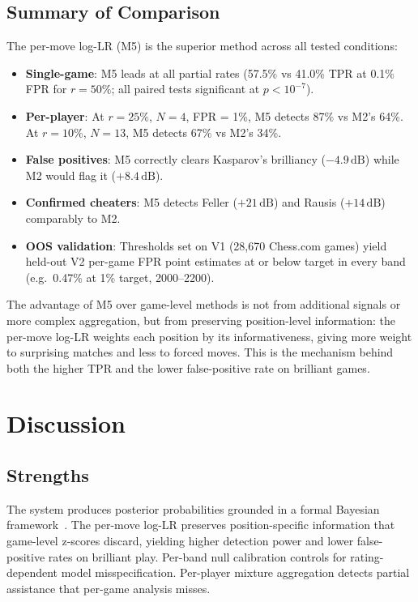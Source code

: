 \documentclass[11pt,a4paper]{article}
\newcommand{\dB}{\,\mathrm{dB}}
\theoremstyle{definition}
\begin{document}
\subsection{Summary of Comparison}
\label{sec:synth-summary}

The per-move log-LR (M5) is the superior method across all tested
conditions:

\begin{itemize}[nosep]
  \item \textbf{Single-game}: M5 leads at all partial rates
    (57.5\% vs 41.0\% TPR at 0.1\% FPR for $r = 50\%$; all paired
    tests significant at $p < 10^{-7}$).
  \item \textbf{Per-player}: At $r = 25\%$, $N = 4$, FPR = 1\%,
    M5 detects 87\% vs M2's 64\%.  At $r = 10\%$, $N = 13$, M5
    detects 67\% vs M2's 34\%.
  \item \textbf{False positives}: M5 correctly clears Kasparov's
    brilliancy ($-4.9\dB$) while M2 would flag it ($+8.4\dB$).
  \item \textbf{Confirmed cheaters}: M5 detects Feller ($+21\dB$)
    and Rausis ($+14\dB$) comparably to M2.
  \item \textbf{OOS validation}: Thresholds set on V1 (28{,}670
    Chess.com games) yield held-out V2 per-game FPR point estimates
    at or below target in every band (e.g.\ 0.47\% at 1\% target,
    2000--2200).
\end{itemize}

\noindent
The advantage of M5 over game-level methods is not from additional
signals or more complex aggregation, but from preserving
position-level information: the per-move log-LR weights each position
by its informativeness, giving more weight to surprising matches and
less to forced moves.  This is the mechanism behind both the higher
TPR and the lower false-positive rate on brilliant games.


\section{Discussion}
\label{sec:discussion}

\subsection{Strengths}

The system produces posterior probabilities grounded in a formal
Bayesian framework~\citep{kass1995bayes}.  The per-move log-LR preserves position-specific
information that game-level z-scores discard, yielding higher detection
power and lower false-positive rates on brilliant play.  Per-band null
calibration controls for rating-dependent model misspecification.
Per-player mixture aggregation detects partial assistance that per-game
analysis misses.
\end{document}
